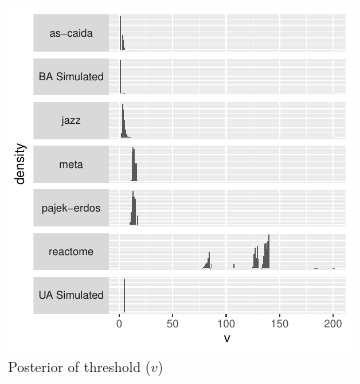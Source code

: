 \documentclass[
  10pt,
  a4paper,
]{scrreprt}
\theoremstyle{definition}
\theoremstyle{plain}
\theoremstyle{plain}
\theoremstyle{remark}
\begin{document}
{\begin{figure}
\begin{minipage}[t]{0.50\linewidth}
{\begin{figure}[H]

{\centering \includegraphics[width=1\textwidth,height=\textheight]{doc_files/figure-pdf/fig-thresh-1.pdf}

}

\caption{\label{fig-thresh}Posterior of threshold (\(v\))}

\end{figure}

}

\end{minipage}%
%
\begin{minipage}[t]{0.50\linewidth}

{\centering 

\begin{figure}[H]


\end{figure}}
\end{minipage}
\end{figure}}
\end{document}
